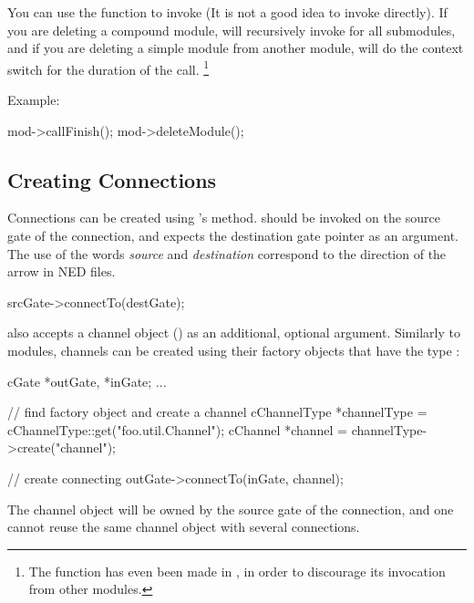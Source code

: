 You can use the  function to invoke 
(It is not a good idea to invoke  directly). If you are
deleting a compound module,  will recursively invoke
 for all submodules, and if you are deleting a simple
module from another module,  will do the context switch
for the duration of the call.
  \footnote{The  function has even been made 
  in , in order to discourage its invocation from
  other modules.}

Example:

\begin{cpp}
mod->callFinish();
mod->deleteModule();
\end{cpp}


\subsection{Creating Connections}
\label{sec:simple-modules:creating-connections}

Connections can be created using 's 
method.  should be invoked on the source gate
of the connection, and expects the destination gate pointer as
an argument. The use of the words \textit{source} and \textit{destination}
correspond to the direction of the arrow in NED files.

\begin{cpp}
srcGate->connectTo(destGate);
\end{cpp}

 also accepts a channel object () as an
additional, optional argument. Similarly to modules, channels can be
created using their factory objects that have the type :

\begin{cpp}
cGate *outGate, *inGate;
...

// find factory object and create a channel
cChannelType *channelType = cChannelType::get("foo.util.Channel");
cChannel *channel = channelType->create("channel");

// create connecting
outGate->connectTo(inGate, channel);
\end{cpp}

The channel object will be owned by the source gate of the connection, and
one cannot reuse the same channel object with several connections.

